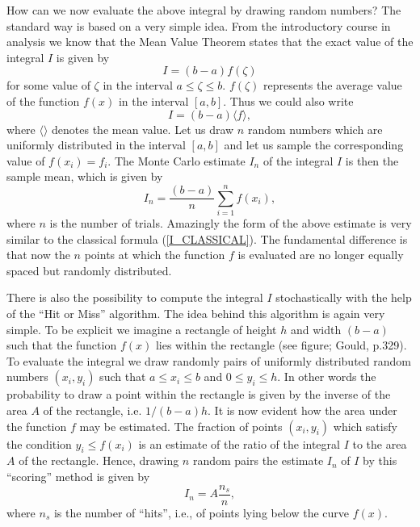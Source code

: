 How can we now evaluate the above integral by drawing random numbers?
The standard way is based on a very simple idea. 
From the introductory course in analysis we know that the Mean 
Value Theorem states that the exact value of the integral $I$ is 
given by
\begin{equation}
I= (b-a) f(\zeta)
\end{equation}
for some value of $\zeta$ in the interval $a \le \zeta \le b$. $f(\zeta)$
represents the average value of the function $f(x)$ 
in the interval $[a,b]$. Thus we could also write
\begin{equation}
I = (b-a) \langle f \rangle,
\end{equation}
where $\langle  \rangle$ denotes the mean value.
Let us draw $n$
random numbers which are uniformly distributed in the interval $[a,b]$
and let us sample the corresponding value of $f(x_i)=f_i$. The Monte Carlo
estimate $I_n$ of the integral $I$ is then the sample mean, which is
given by
\begin{equation}
\label{MCI_STANDARD}
I_n = \frac{(b-a)}{n} \sum_{i=1}^{n} f(x_i),
\end{equation}
where $n$ is the number of trials. Amazingly the form of the above
estimate is very similar to the classical formula (\ref{I_CLASSICAL}).
The fundamental difference is that now the $n$ points at which the
function $f$ is evaluated are no longer equally spaced but randomly 
distributed.

There is also the possibility to compute the integral $I$
stochastically
with the help of the ``Hit or Miss'' algorithm. The idea behind
this algorithm is again very simple. To be explicit we imagine a rectangle
of height $h$ and width $(b-a)$ such that the function $f(x)$ lies
within the rectangle (see figure; Gould, p.329). To evaluate the
integral we draw randomly pairs of uniformly distributed random
numbers $(x_i,y_i)$ such that $a \le x_i \le b$ and $0 \le y_i \le h$.
In other words the probability to draw a point within the rectangle is
given by the inverse of the area $A$ of the rectangle,
i.e. $1/(b-a)h$. It is now evident how the area under the
function $f$ may be estimated. The fraction of points $(x_i,y_i)$
which satisfy the condition $y_i \le f(x_i)$ is an estimate of the
ratio of the integral $I$ to the area $A$ of the rectangle. Hence,
drawing $n$ random pairs the estimate $I_n$ of $I$ by this ``scoring''
method is given by
\begin{equation}
I_n = A \frac{n_s}{n},
\end{equation}
where $n_s$ is the number of ``hits'', i.e., of points lying below the
curve $f(x)$.

